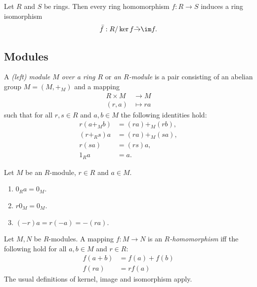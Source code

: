 \documentclass{article}
\begin{document}
\begin{theorem}
	Let $R$ and $S$ be rings. Then every ring homomorphism $f:R\to S$ induces a ring isomorphism
	\begin{align*}
		\bar f:R/\ker f \tilde\to \im f.
	\end{align*}
\end{theorem}

\subsection{Modules}

\begin{definition}
	A \emph{(left) module $M$ over a ring $R$} or \emph{an $R$-module} is a pair consisting of an
	abelian group $M=(M,+_M)$ and a mapping
	\begin{align*}
		R\times M & \to M      \\
		(r,a)     & \mapsto ra
	\end{align*}
	such that for all $r,s\in R$ and $a,b\in M$ the following identities hold:
	\begin{align*}
		r(a +_M b) & = (ra) +_M (rb), \\
		(r+_Rs)a   & = (ra) +_M (sa), \\
		r(sa)      & = (rs)a,         \\
		1_Ra       & = a.
	\end{align*}
\end{definition}

\begin{lemma}[Notes 3.7.8]
	Let $M$ be an $R$-module, $r\in R$ and $a\in M$.
	\begin{enumerate}
		\item $0_Ra=0_M$.
		\item $r0_M=0_M$.
		\item $(-r)a=r(-a)=-(ra)$.
	\end{enumerate}
\end{lemma}

\begin{definition}
	Let $M,N$ be $R$-modules. A mapping $f:M\to N$ is an \emph{$R$-homomorphism} iff the following
	hold for all $a,b\in M$ and $r\in R$:
	\begin{align*}
		f(a+b) & = f(a) + f(b) \\
		f(ra)  & = rf(a)
	\end{align*}
	The usual definitions of kernel, image and isomorphism apply.
\end{definition}
\end{document}
